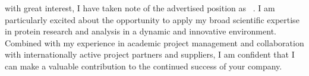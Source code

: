 


                 {\def\phrase{Lehre}}{}
            {\def\phrase{Forschungsmanagement}}{}
             {\def\phrase{industriellen Forschung}}{}
            {\def\phrase{strategischen Geschäftsentwicklung}}{}
            {\def\phrase{industriellen Produktion}}{}
                    {\def\phrase{Qualitätsmanagement}}{}
                   {\def\phrase{sowie meine Managements- und Führungskompetenzen}}{\def\phrase{}}
                    {\def\phrase{Qualitätsmanagement}}{}
                {\def\phrase{Qualitätsmanagement}}{}
  {\def\phrase{Sicherheit}}{}
             {\def\phrase{Marketing}}{}
with great interest, I have taken note of the advertised position as \stelleText~\firmaText. I am particularly excited about the opportunity to apply my broad scientific expertise in protein research and analysis in a dynamic and innovative environment. Combined with my experience in academic project management and collaboration with internationally active project partners and suppliers, I am confident that I can make a valuable contribution to the continued success of your company. \par
